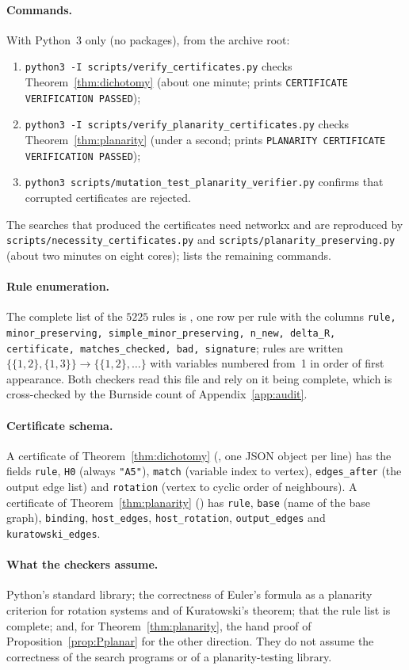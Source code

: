 \documentclass[10pt]{article}
\theoremstyle{definition}
\theoremstyle{plain}
\theoremstyle{remark}
\begin{document}
\paragraph{Commands.} With Python~3 only (no packages), from the archive root:
\begin{enumerate}
\item \texttt{python3 -I scripts/\allowbreak verify\_\allowbreak certificates.py} checks Theorem~\ref{thm:dichotomy} (about one minute; prints \texttt{CERTIFICATE VERIFICATION PASSED});
\item \texttt{python3 -I scripts/\allowbreak verify\_\allowbreak planarity\_\allowbreak certificates.py} checks Theorem~\ref{thm:planarity} (under a second; prints \texttt{PLANARITY CERTIFICATE VERIFICATION PASSED});
\item \texttt{python3 scripts/\allowbreak mutation\_\allowbreak test\_\allowbreak planarity\_\allowbreak verifier.py} confirms that corrupted certificates are rejected.
\end{enumerate}
The searches that produced the certificates need networkx and are reproduced by \texttt{scripts/necessity\_certificates.py} and \texttt{scripts/planarity\_preserving.py} (about two minutes on eight cores);  lists the remaining commands.
\paragraph{Rule enumeration.} The complete list of the $5225$ rules is , one row per rule with the columns \texttt{rule, minor\_preserving, simple\_minor\_preserving, n\_new, delta\_R, certificate, matches\_checked, bad, signature}; rules are written $\{\{1,2\},\{1,3\}\}\to\{\{1,2\},\dots\}$ with variables numbered from~1 in order of first appearance. Both checkers read this file and rely on it being complete, which is cross-checked by the Burnside count of Appendix~\ref{app:audit}.
\paragraph{Certificate schema.} A certificate of Theorem~\ref{thm:dichotomy} (, one JSON object per line) has the fields \texttt{rule}, \texttt{H0} (always \texttt{"A5"}), \texttt{match} (variable index to vertex), \texttt{edges\_after} (the output edge list) and \texttt{rotation} (vertex to cyclic order of neighbours). A certificate of Theorem~\ref{thm:planarity} () has \texttt{rule}, \texttt{base} (name of the base graph), \texttt{binding}, \texttt{host\_edges}, \texttt{host\_rotation}, \texttt{output\_edges} and \texttt{kuratowski\_edges}.
\paragraph{What the checkers assume.} Python's standard library; the correctness of Euler's formula as a planarity criterion for rotation systems and of Kuratowski's theorem; that the rule list is complete; and, for Theorem~\ref{thm:planarity}, the hand proof of Proposition~\ref{prop:Pplanar} for the other direction. They do not assume the correctness of the search programs or of a planarity-testing library.
\end{document}
